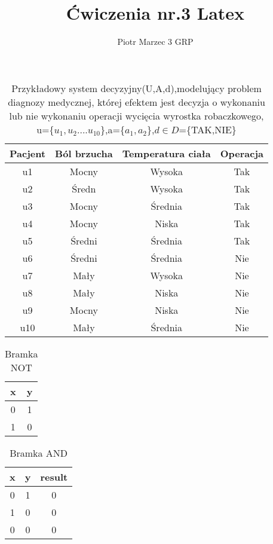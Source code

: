 \documentclass[a4paper]{article}
\author{Piotr Marzec 3 GRP}
\title{Ćwiczenia nr.3 Latex}
\begin{document}
\begin{center}
    \begin{table}[H]
        \centering\caption{Przykładowy system decyzyjny(U,A,d),modelujący problem diagnozy medycznej, której efektem jest decyzja o wykonaniu lub nie wykonaniu operacji wycięcia wyrostka robaczkowego, u=\{$u_1,u_2....u_10$\},a=\{$a_1,a_2$\},$d\in D$=\{TAK,NIE\} }
        \begin{tabular}{c|c|c|c}
             \hline
             \hline
           Pacjent & Ból brzucha & Temperatura ciała & Operacja\\
           \hline
           u1 & Mocny & Wysoka & Tak\\
           u2 & Średn & Wysoka & Tak\\
           u3 & Mocny & Średnia & Tak\\
           u4 & Mocny & Niska & Tak \\
           u5 & Średni & Średnia & Tak \\
           u6 & Średni & Średnia & Nie \\
           u7 & Mały & Wysoka & Nie \\
           u8 & Mały & Niska & Nie \\
           u9 & Mocny & Niska & Nie \\
           u10 & Mały & Średnia & Nie \\
           \hline
           \hline
        \end{tabular}
    \end{table}
    \begin{table}[H]
        \centering\caption{Bramka NOT}
        \begin{tabular}{|c|c|}
            \hline
             x&y  \\
             \hline
             0&1 \\
             \hline
             1&0 \\
             \hline
        \end{tabular}
    \end{table}
       \begin{table}[H]
        \centering\caption{Bramka AND}
        \begin{tabular}{|c|c|c|}
            \hline
             x&y&result  \\
             \hline
             0&1&0 \\
             \hline
             1&0&0 \\
             \hline
             0&0&0\\

\end{tabular}
\end{table}
\end{center}
\end{document}
